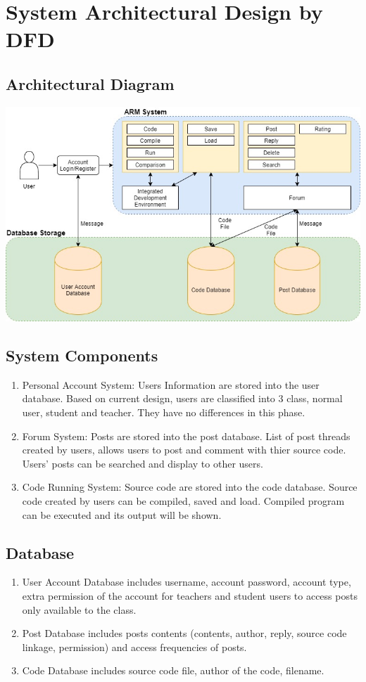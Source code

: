 \chapter{System Architectural Design by DFD}
\section{Architectural Diagram}
\includegraphics[scale=0.5]{Doc/Pics/architectural_diagram}
\newpage
\section{System Components}
\begin{enumerate}
	\item Personal Account System: Users Information are stored into the user database. Based on current design, users are classified into 3 class, normal user, student and teacher. They have no differences in this phase.
	\item Forum System: Posts are stored into the post database. List of post threads created by users, allows users to post and comment with thier source code. Users' posts can be searched and display to other users.
	\item Code Running System: Source code are stored into the code database. Source code created by users can be compiled, saved and load. Compiled program can be executed and its output will be shown.
\end{enumerate}
\section{Database}
\begin{enumerate}
	\item User Account Database includes username, account password, account type, extra permission of the account for teachers and student users to access posts only available to the class.
	\item Post Database includes posts contents (contents, author, reply, source code linkage, permission) and access frequencies of posts.
  \item Code Database includes source code file, author of the code, filename.
\end{enumerate}
